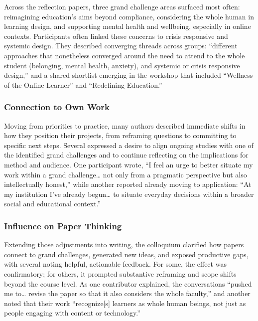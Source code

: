 \documentclass[
  letterpaper,
  DIV=11,
  numbers=noendperiod]{scrartcl}
\begin{document}
Across the reflection papers, three grand challenge areas surfaced most
often: reimagining education's aims beyond compliance, considering the
whole human in learning design, and supporting mental health and
wellbeing, especially in online contexts. Participants often linked
these concerns to crisis responsive and systemic design. They described
converging threads across groups: ``different approaches that
nonetheless converged around the need to attend to the whole student
(belonging, mental health, anxiety), and systemic or crisis responsive
design,'' and a shared shortlist emerging in the workshop that included
``Wellness of the Online Learner'' and ``Redefining Education.''

\subsubsection{Connection to Own Work}\label{connection-to-own-work}

Moving from priorities to practice, many authors described immediate
shifts in how they position their projects, from reframing questions to
committing to specific next steps. Several expressed a desire to align
ongoing studies with one of the identified grand challenges and to
continue reflecting on the implications for method and audience. One
participant wrote, ``I feel an urge to better situate my work within a
grand challenge\ldots{} not only from a pragmatic perspective but also
intellectually honest,'' while another reported already moving to
application: ``At my institution I've already begun\ldots{} to situate
everyday decisions within a broader social and educational context.''

\subsubsection{Influence on Paper
Thinking}\label{influence-on-paper-thinking}

Extending those adjustments into writing, the colloquium clarified how
papers connect to grand challenges, generated new ideas, and exposed
productive gaps, with several noting helpful, actionable feedback. For
some, the effect was confirmatory; for others, it prompted substantive
reframing and scope shifts beyond the course level. As one contributor
explained, the conversations ``pushed me to\ldots{} revise the paper so
that it also considers the whole faculty,'' and another noted that their
work ``recognize{[}s{]} learners as whole human beings, not just as
people engaging with content or technology.''
\end{document}
